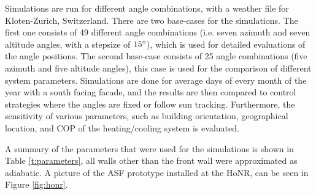 		Simulations are run for different angle combinations, with a weather file for Kloten-Zurich, Switzerland. There are two base-cases for the simulations. The first one consists of 49 different angle combinations (i.e. seven azimuth and seven altitude angles, with a stepsize of $15\degree$), which is used for detailed evaluations of the angle positions. The second base-case consists of 25 angle combinations (five azimuth and five altitude angles), this case is used for the comparison of different system parameters. Simulations are done for average days of every month of the year with a south facing facade, and the results are then compared to control strategies where the angles are fixed or follow sun tracking. Furthermore, the sensitivity of various parameters, such as building orientation, geographical location, and COP of the heating/cooling system is evaluated. 

		A summary of the parameters that were used for the simulations is shown in Table \ref{t:parameters}, all walls other than the front wall were approximated as adiabatic. A picture of the ASF prototype installed at the HoNR, can be seen in Figure \ref{fig:honr}. 

		



